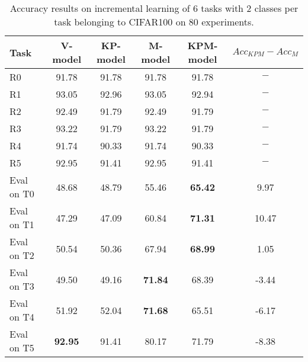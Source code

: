 \begin{table}[H]
\centering
\begin{tabular}{lccccc}
\toprule
Task  & V-model & KP-model & M-model & KPM-model & $Acc_{KPM}-Acc_{M}$ \\
\midrule
R0 & 91.78 & 91.78 & 91.78 & 91.78 & $-$ \\
R1 & 93.05 & 92.96 & 93.05 & 92.94 & $-$ \\
R2 & 92.49 & 91.79 & 92.49 & 91.79 & $-$ \\
R3 & 93.22 & 91.79 & 93.22 & 91.79 & $-$ \\
R4 & 91.74 & 90.33 & 91.74 & 90.33 & $-$ \\
R5 & 92.95 & 91.41 & 92.95 & 91.41 & $-$ \\

 \hline 
Eval on T0 & 48.68 & 48.79 & 55.46 & \textbf{65.42} & 9.97 \\
Eval on T1 & 47.29 & 47.09 & 60.84 & \textbf{71.31} & 10.47 \\
Eval on T2 & 50.54 & 50.36 & 67.94 & \textbf{68.99} & 1.05 \\
Eval on T3 & 49.50 & 49.16 & \textbf{71.84} & 68.39 & -3.44 \\
Eval on T4 & 51.92 & 52.04 & \textbf{71.68} & 65.51 & -6.17 \\
Eval on T5 & \textbf{92.95} & 91.41 & 80.17 & 71.79 & -8.38 \\
\bottomrule
\end{tabular}
\caption{Accuracy results on incremental learning of 6 tasks with 2 classes per task belonging to CIFAR100 on 80 experiments.}
\end{table}
